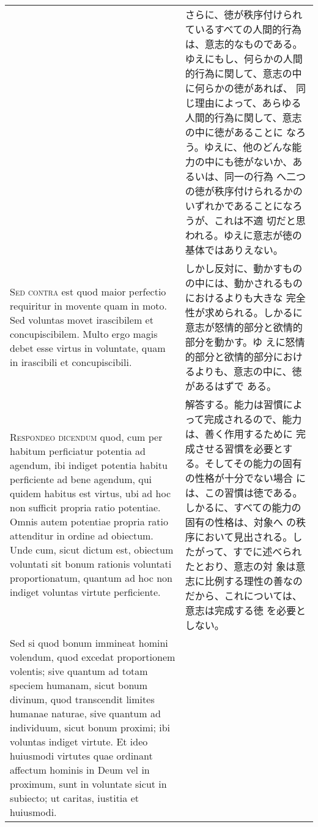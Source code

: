 \documentclass[10pt]{jsarticle}
\begin{document}
\begin{longtable}{p{21em}p{21em}}
&

さらに、徳が秩序付けられているすべての人間的行為は、意志的なものである。
ゆえにもし、何らかの人間的行為に関して、意志の中に何らかの徳があれば、
同じ理由によって、あらゆる人間的行為に関して、意志の中に徳があることに
なろう。ゆえに、他のどんな能力の中にも徳がないか、あるいは、同一の行為
へ二つの徳が秩序付けられるかのいずれかであることになろうが、これは不適
切だと思われる。ゆえに意志が徳の基体ではありえない。
 
\\

{\scshape Sed contra} est quod maior perfectio requiritur in movente
quam in moto. Sed voluntas movet irascibilem et concupiscibilem. Multo
ergo magis debet esse virtus in voluntate, quam in irascibili et
concupiscibili.

&

 しかし反対に、動かすものの中には、動かされるものにおけるよりも大きな
 完全性が求められる。しかるに意志が怒情的部分と欲情的部分を動かす。ゆ
 えに怒情的部分と欲情的部分におけるよりも、意志の中に、徳があるはずで
 ある。
 
\\

{\scshape Respondeo dicendum} quod, cum per habitum perficiatur
potentia ad agendum, ibi indiget potentia habitu perficiente ad bene
agendum, qui quidem habitus est virtus, ubi ad hoc non sufficit
propria ratio potentiae. Omnis autem potentiae propria ratio
attenditur in ordine ad obiectum. Unde cum, sicut dictum est, obiectum
voluntati sit bonum rationis voluntati proportionatum, quantum ad hoc
 non indiget voluntas virtute perficiente.

 &

解答する。能力は習慣によって完成されるので、能力は、善く作用するために
完成させる習慣を必要とする。そしてその能力の固有の性格が十分でない場合
には、この習慣は徳である。しかるに、すべての能力の固有の性格は、対象へ
の秩序において見出される。したがって、すでに述べられたとおり、意志の対
象は意志に比例する理性の善なのだから、これについては、意志は完成する徳
を必要としない。

 
 \\

 Sed si quod bonum immineat
homini volendum, quod excedat proportionem volentis; sive quantum ad
totam speciem humanam, sicut bonum divinum, quod transcendit limites
humanae naturae, sive quantum ad individuum, sicut bonum proximi; ibi
voluntas indiget virtute. Et ideo huiusmodi virtutes quae ordinant
affectum hominis in Deum vel in proximum, sunt in voluntate sicut in
subiecto; ut caritas, iustitia et huiusmodi.


\end{longtable}
\end{document}
